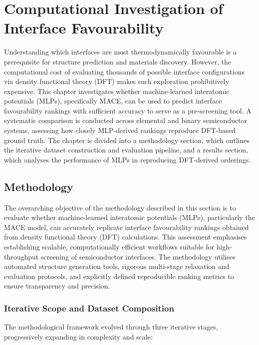 \chapter{Computational Investigation of Interface Favourability}
\label{chapter:computational_investigation}

Understanding which interfaces are most thermodynamically favourable is a prerequisite for structure prediction and
materials discovery. However, the computational cost of evaluating thousands of possible interface configurations via
density functional theory (DFT) makes such exploration prohibitively expensive. This chapter investigates whether
machine-learned interatomic potentials (MLPs), specifically MACE, can be used to predict interface favourability
rankings with sufficient accuracy to serve as a pre-screening tool. A systematic comparison is conducted across
elemental and binary semiconductor systems, assessing how closely MLP-derived rankings reproduce DFT-based ground
truth. The chapter is divided into a methodology section, which outlines the iterative dataset construction and
evaluation pipeline, and a results section, which analyses the performance of MLPs in reproducing DFT-derived orderings.

\section{Methodology}
\label{section:methodology}

The overarching objective of the methodology described in this section is to evaluate whether machine-learned
interatomic potentials (MLPs), particularly the MACE model, can accurately replicate interface favourability rankings
obtained from density functional theory (DFT) calculations. This assessment emphasises establishing scalable,
computationally efficient workflows suitable for high-throughput screening of semiconductor interfaces. The methodology
utilises automated structure generation tools, rigorous multi-stage relaxation and evaluation protocols, and explicitly
defined reproducible ranking metrics to ensure transparency and precision.

\subsection{Iterative Scope and Dataset Composition}

The methodological framework evolved through three iterative stages, progressively expanding in complexity and scale:

